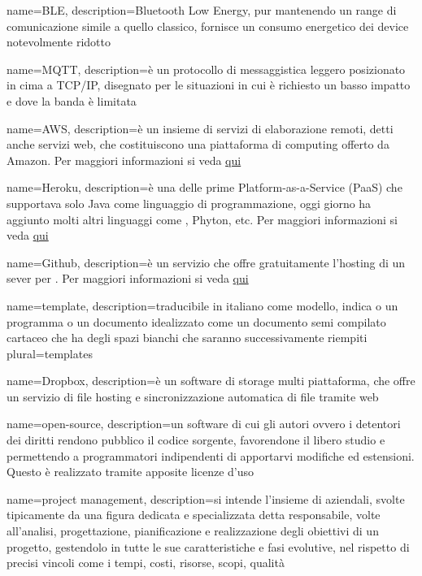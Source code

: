  {
	name=BLE,
	description={Bluetooth Low Energy,  pur mantenendo un range di comunicazione simile a quello classico, fornisce un  consumo energetico dei device notevolmente ridotto}
}

 {
	name=MQTT,
	description={è un protocollo di messaggistica leggero posizionato in cima a TCP/IP, disegnato per le situazioni in cui è richiesto un basso impatto e dove la banda è limitata }
}

 {
	name=AWS,
	description={è un insieme di servizi di elaborazione remoti, detti anche servizi web, che costituiscono una piattaforma di computing offerto da Amazon. Per maggiori informazioni si veda \href{https://aws.amazon.com/it/}{qui}}
}

 {
	name=Heroku,
	description={è una  delle prime  Platform-as-a-Service (PaaS) che supportava solo Java come linguaggio di programmazione, oggi giorno ha aggiunto molti altri linguaggi come , Phyton, etc. Per maggiori informazioni si veda \href{https://www.heroku.com}{qui}}
}

 {
	name=Github,
	description={è un servizio che offre gratuitamente l'hosting di un sever per . Per maggiori informazioni si veda \href{https://github.com}{qui}}
}

 {
	name=template,
	description={traducibile in italiano come modello, indica o un programma o un documento idealizzato come un documento semi compilato cartaceo che ha degli spazi bianchi che saranno successivamente riempiti}
	plural=templates
}

 {
	name=Dropbox,
	description={è un software di  storage multi piattaforma, che offre un servizio di file hosting e sincronizzazione automatica di file tramite web}
}

 {
	name=open-source,
	description={un software di cui gli autori ovvero i detentori dei diritti rendono pubblico il codice sorgente, favorendone il libero studio e permettendo a programmatori indipendenti di apportarvi modifiche ed estensioni. Questo è realizzato tramite apposite licenze d'uso}
}

 {
	name=project management,
	description={si intende l'insieme di  aziendali, svolte tipicamente da una figura dedicata e specializzata detta responsabile, volte all'analisi, progettazione, pianificazione e realizzazione degli obiettivi di un progetto, gestendolo in tutte le sue caratteristiche e fasi evolutive, nel rispetto di precisi vincoli come i tempi, costi, risorse, scopi, qualità}
}

